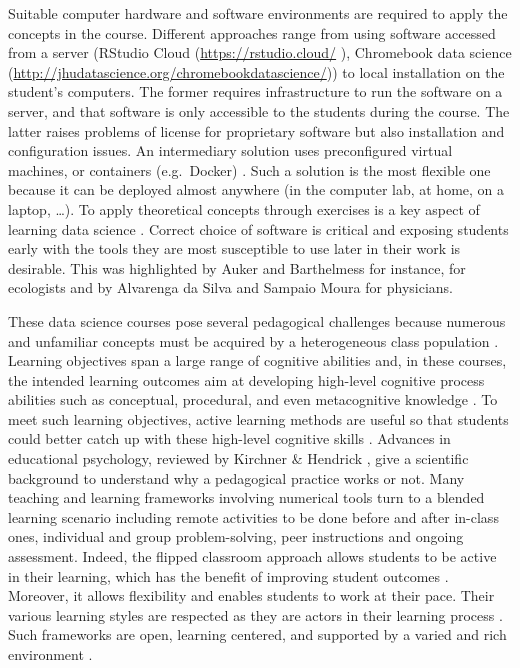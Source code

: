 \documentclass{aims}
\theoremstyle{definition}
\begin{document}
Suitable computer hardware and software environments are required to
apply the concepts in the course. Different approaches range from using
software accessed from a server \cite{Theobold2021} (RStudio Cloud
(\url{https://rstudio.cloud/} \cite{Rstudio2015}), Chromebook data
science (\url{http://jhudatascience.org/chromebookdatascience/})) to
local installation on the student's computers. The former requires
infrastructure to run the software on a server, and that software is
only accessible to the students during the course. The latter raises
problems of license for proprietary software but also installation and
configuration issues. An intermediary solution uses preconfigured
virtual machines, or containers (e.g.~Docker)
\cite{Cetinkaya-Rundel2018, Boettiger2015}. Such a solution is the most
flexible one because it can be deployed almost anywhere (in the computer
lab, at home, on a laptop, \ldots). To apply theoretical concepts
through exercises is a key aspect of learning data science
\cite{Larwin2011}. Correct choice of software is critical and exposing
students early with the tools they are most susceptible to use later in
their work is desirable. This was highlighted by Auker and Barthelmess
\cite{Auker2020} for instance, for ecologists and by Alvarenga da Silva
and Sampaio Moura \cite{Alvarenga2020} for physicians.

These data science courses pose several pedagogical challenges because
numerous and unfamiliar concepts must be acquired by a heterogeneous
class population \cite{Guzman2019}. Learning objectives span a large
range of cognitive abilities and, in these courses, the intended
learning outcomes aim at developing high-level cognitive process
abilities such as conceptual, procedural, and even metacognitive
knowledge \cite{Krathwohl2002}. To meet such learning objectives, active
learning methods are useful so that students could better catch up with
these high-level cognitive skills \cite{Freeman2014}. Advances in
educational psychology, reviewed by Kirchner \& Hendrick
\cite{Kirschner2020}, give a scientific background to understand why a
pedagogical practice works or not. Many teaching and learning frameworks
involving numerical tools turn to a blended learning scenario including
remote activities to be done before and after in-class ones, individual
and group problem-solving, peer instructions and ongoing assessment.
Indeed, the flipped classroom approach allows students to be active in
their learning, which has the benefit of improving student outcomes
\cite{Freeman2014}. Moreover, it allows flexibility and enables students
to work at their pace. Their various learning styles are respected as
they are actors in their learning process \cite{Spadafora2018}. Such
frameworks are open, learning centered, and supported by a varied and
rich environment \cite{Burton2011}.
\end{document}
